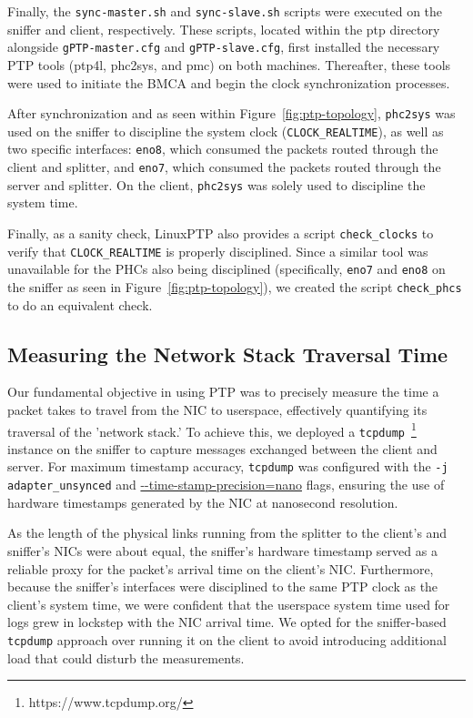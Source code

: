 Finally, the \texttt{sync-master.sh} and \texttt{sync-slave.sh} scripts were executed on the sniffer and client, respectively. These scripts, located within the ptp directory alongside \texttt{gPTP-master.cfg} and \texttt{gPTP-slave.cfg}, first installed the necessary \ac{PTP} tools (ptp4l, phc2sys, and pmc) on both machines. Thereafter, these tools were used to initiate the \ac{BMCA} and begin the clock synchronization processes.

After synchronization and as seen within Figure~\ref{fig:ptp-topology}, \texttt{phc2sys} was used on the sniffer to discipline the system clock (\texttt{CLOCK\_REALTIME}), as well as two specific interfaces: \texttt{eno8}, which consumed the packets routed through the client and splitter, and \texttt{eno7}, which consumed the packets routed through the server and splitter. On the client, \texttt{phc2sys} was solely used to discipline the system time.

Finally, as a sanity check, LinuxPTP also provides a script \texttt{check\_clocks} to verify that \texttt{CLOCK\_REALTIME} is properly disciplined. Since a similar tool was unavailable for the \ac{PHC}s also being disciplined (specifically, \texttt{eno7} and \texttt{eno8} on the sniffer as seen in Figure~\ref{fig:ptp-topology}), we created the script \texttt{check\_phcs} to do an equivalent check.

\subsection{Measuring the Network Stack Traversal Time}
\label{subsec:the-experiment}
Our fundamental objective in using \ac{PTP} was to precisely measure the time a packet takes to travel from the \ac{NIC} to userspace, effectively quantifying its traversal of the 'network stack.' To achieve this, we deployed a \texttt{tcpdump}~\footnote{https://www.tcpdump.org/} instance on the sniffer to capture messages exchanged between the client and server. For maximum timestamp accuracy, \texttt{tcpdump} was configured with the \texttt{-j adapter\_unsynced} and \url{--time-stamp-precision=nano} flags, ensuring the use of hardware timestamps generated by the \ac{NIC} at nanosecond resolution.

As the length of the physical links running from the splitter to the client's and sniffer's \ac{NIC}s were about equal, the sniffer's hardware timestamp served as a reliable proxy for the packet's arrival time on the client's \ac{NIC}. Furthermore, because the sniffer's interfaces were disciplined to the same \ac{PTP} clock as the client's system time, we were confident that the userspace system time used for logs grew in lockstep with the \ac{NIC} arrival time. We opted for the sniffer-based \texttt{tcpdump} approach over running it on the client to avoid introducing additional load that could disturb the measurements.

